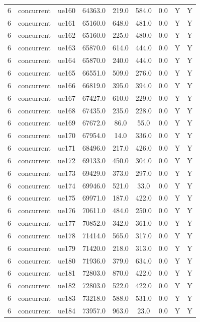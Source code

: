 \begin{table}[ht]
\begin{tabular}{|c|c|c|c|c|c|c|c|c|}
6 & concurrent & ue160 & 64363.0 & 219.0 & 584.0 & 0.0 & Y & Y \\
6 & concurrent & ue161 & 65160.0 & 648.0 & 481.0 & 0.0 & Y & Y \\
6 & concurrent & ue162 & 65160.0 & 225.0 & 480.0 & 0.0 & Y & Y \\
6 & concurrent & ue163 & 65870.0 & 614.0 & 444.0 & 0.0 & Y & Y \\
6 & concurrent & ue164 & 65870.0 & 240.0 & 444.0 & 0.0 & Y & Y \\
6 & concurrent & ue165 & 66551.0 & 509.0 & 276.0 & 0.0 & Y & Y \\
6 & concurrent & ue166 & 66819.0 & 395.0 & 394.0 & 0.0 & Y & Y \\
6 & concurrent & ue167 & 67427.0 & 610.0 & 229.0 & 0.0 & Y & Y \\
6 & concurrent & ue168 & 67435.0 & 235.0 & 228.0 & 0.0 & Y & Y \\
6 & concurrent & ue169 & 67672.0 & 86.0 & 55.0 & 0.0 & Y & Y \\
6 & concurrent & ue170 & 67954.0 & 14.0 & 336.0 & 0.0 & Y & Y \\
6 & concurrent & ue171 & 68496.0 & 217.0 & 426.0 & 0.0 & Y & Y \\
6 & concurrent & ue172 & 69133.0 & 450.0 & 304.0 & 0.0 & Y & Y \\
6 & concurrent & ue173 & 69429.0 & 373.0 & 297.0 & 0.0 & Y & Y \\
6 & concurrent & ue174 & 69946.0 & 521.0 & 33.0 & 0.0 & Y & Y \\
6 & concurrent & ue175 & 69971.0 & 187.0 & 422.0 & 0.0 & Y & Y \\
6 & concurrent & ue176 & 70611.0 & 484.0 & 250.0 & 0.0 & Y & Y \\
6 & concurrent & ue177 & 70852.0 & 342.0 & 361.0 & 0.0 & Y & Y \\
6 & concurrent & ue178 & 71414.0 & 565.0 & 317.0 & 0.0 & Y & Y \\
6 & concurrent & ue179 & 71420.0 & 218.0 & 313.0 & 0.0 & Y & Y \\
6 & concurrent & ue180 & 71936.0 & 379.0 & 634.0 & 0.0 & Y & Y \\
6 & concurrent & ue181 & 72803.0 & 870.0 & 422.0 & 0.0 & Y & Y \\
6 & concurrent & ue182 & 72803.0 & 522.0 & 422.0 & 0.0 & Y & Y \\
6 & concurrent & ue183 & 73218.0 & 588.0 & 531.0 & 0.0 & Y & Y \\
6 & concurrent & ue184 & 73957.0 & 963.0 & 23.0 & 0.0 & Y & Y \\

\end{tabular}
\end{table}
